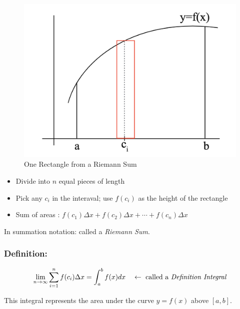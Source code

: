 \begin{figure}[ht!]
    \centering
    \includegraphics[scale=0.5]{./images/lecture_12_figure_2.png}
    \caption{One Rectangle from a Riemann Sum}
\end{figure}

\begin{itemize}
    \item Divide into $n$ equal pieces of length 
    \item Pick any $c_i$ in the interaval; use $f(c_i)$ as the height of the rectangle
    \item Sum of areas : $f(c_1)\Delta x + f(c_2)\Delta x + \cdots + f(c_n)\Delta x$
\end{itemize}

In summation notation:  called a {\it Riemann Sum}.

\subsubsection{Definition:}
$$
\lim_{n \to \infty} \sum^n_{i=1} f(c_i)\Delta x = \int_a^b f(x)dx \quad \leftarrow \text{ called a {\it Definition Integral}}
$$

This integral represents the area under the curve $y = f(x)$ above $[a, b]$.
